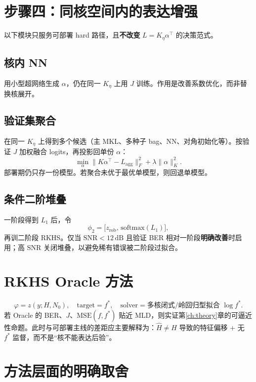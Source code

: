 \section{步骤四：同核空间内的表达增强}

以下模块只服务可部署 hard 路径，且\textbf{不改变} $L=K_\eta\alpha^\top$ 的决策范式。

\subsection{核内 NN}
用小型超网络生成 $\alpha$，仍在同一 $K_\eta$ 上用 $J$ 训练。作用是改善系数优化，而非替换核展开。

\subsection{验证集聚合}
在同一 $K_\eta$ 上得到多个候选（主 MKL、多种子 bag、NN、对角初始化等）。按验证 $J$ 加权融合 logits，再投影回单份 $\alpha$：
\begin{equation}
\min_{\alpha}\|K\alpha^\top-L_{\mathrm{agg}}\|_F^2+\lambda\|\alpha\|_{K}^2.
\end{equation}
部署期仍只存一份模型。若聚合未优于最优单模型，则回退单模型。

\subsection{条件二阶堆叠}
一阶段得到 $L_1$ 后，令
\begin{equation}
\phi_2=\big[z_{\mathrm{rob}},\,\mathrm{softmax}(L_1)\big],
\end{equation}
再训二阶段 RKHS。仅当 $\mathrm{SNR}<12\,\mathrm{dB}$ 且验证 BER 相对一阶段\textbf{明确改善}时启用；高 SNR 关闭堆叠，以避免稀有错误被二阶段过拟合。

\section{RKHS Oracle 方法}

\begin{equation}
\varphi=z(y;H,N_0),\quad
\mathrm{target}=f^*,\quad
\mathrm{solver}=\text{多核闭式/岭回归型拟合 }\log f^*.
\end{equation}
若 Oracle 的 BER、$J$、$\mathrm{MSE}(f,f^*)$ 贴近 MLD，则实证第\ref{ch:theory}章的可逼近性命题。此时与可部署主线的差距应主要解释为：$\hat H\neq H$ 导致的特征偏移 + 无 $f^*$ 监督，而不是“核不能表达后验”。

\section{方法层面的明确取舍}

